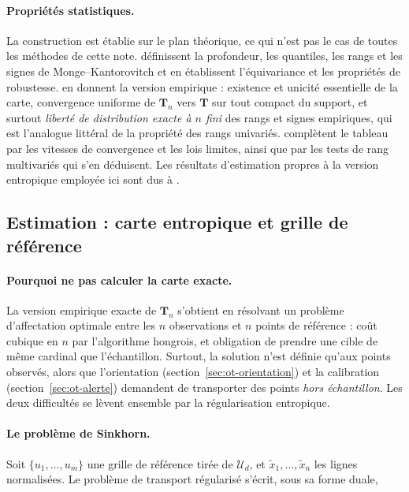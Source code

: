 \documentclass[11pt,a4paper]{article}
\theoremstyle{definition}
\theoremstyle{remark}
\newcommand{\Unif}{\mathcal{U}}
\newcommand{\Tmap}{\mathbf{T}}
\begin{document}
\paragraph{Propriétés statistiques.} La construction est établie sur le plan théorique, ce
qui n'est pas le cas de toutes les méthodes de cette note.
\citet{chernozhukov2017} définissent la profondeur, les quantiles, les rangs et les signes
de Monge--Kantorovitch et en établissent l'équivariance et les propriétés de robustesse.
\citet{hallin2021} en donnent la version empirique : existence et unicité essentielle de la
carte, convergence uniforme de $\Tmap_n$ vers $\Tmap$ sur tout compact du support, et
surtout \emph{liberté de distribution exacte à $n$ fini} des rangs et signes empiriques,
qui est l'analogue littéral de la propriété des rangs univariés.
\citet{ghosal2022} complètent le tableau par les vitesses de convergence et les lois
limites, ainsi que par les tests de rang multivariés qui s'en déduisent. Les résultats
d'estimation propres à la version entropique employée ici sont dus à
\citet{pooladian2021}.

\bigskip

\subsection{Estimation : carte entropique et grille de référence}
\label{sec:ot-estimation}

\medskip

\paragraph{Pourquoi ne pas calculer la carte exacte.} La version empirique exacte de
$\Tmap_n$ s'obtient en résolvant un problème d'affectation optimale entre les $n$
observations et $n$ points de référence : coût cubique en $n$ par l'algorithme hongrois, et
obligation de prendre une cible de même cardinal que l'échantillon. Surtout, la solution
n'est définie qu'aux points observés, alors que l'orientation
(section~\ref{sec:ot-orientation}) et la calibration (section~\ref{sec:ot-alerte})
demandent de transporter des points \emph{hors échantillon}. Les deux difficultés se lèvent
ensemble par la régularisation entropique.

\medskip

\paragraph{Le problème de Sinkhorn.} Soit $\{u_1,\dots,u_m\}$ une grille de référence
tirée de $\Unif_d$, et $\tilde{x}_1,\dots,\tilde{x}_n$ les lignes normalisées. Le problème
de transport régularisé \citep{cuturi2013,peyre2019} s'écrit, sous sa forme duale,
\end{document}
